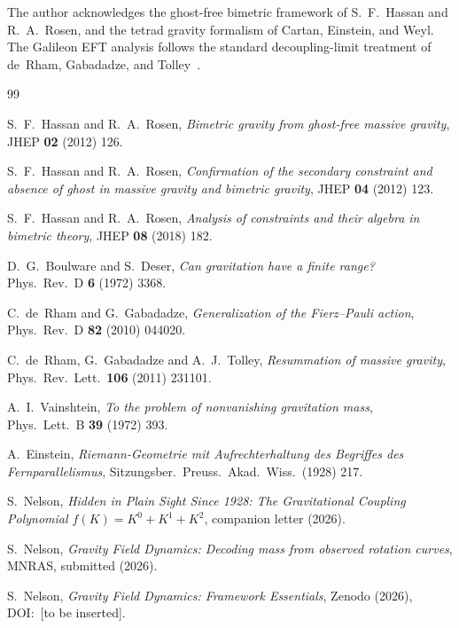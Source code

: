 \documentclass[a4paper,11pt]{article}
\begin{document}
\acknowledgments

The author acknowledges the ghost-free bimetric framework
of S.~F.~Hassan and R.~A.~Rosen, and the tetrad gravity
formalism of Cartan, Einstein, and Weyl. The Galileon
EFT analysis follows the standard decoupling-limit
treatment of de~Rham, Gabadadze, and
Tolley~\cite{deRham2010,deRham2011}.

\begin{thebibliography}{99}

S.~F.~Hassan and R.~A.~Rosen,
\emph{Bimetric gravity from ghost-free massive gravity},
JHEP \textbf{02} (2012) 126.

S.~F.~Hassan and R.~A.~Rosen,
\emph{Confirmation of the secondary constraint and absence
of ghost in massive gravity and bimetric gravity},
JHEP \textbf{04} (2012) 123.

S.~F.~Hassan and R.~A.~Rosen,
\emph{Analysis of constraints and their algebra in
bimetric theory},
JHEP \textbf{08} (2018) 182.

D.~G.~Boulware and S.~Deser,
\emph{Can gravitation have a finite range?}
Phys.\ Rev.\ D \textbf{6} (1972) 3368.

C.~de~Rham and G.~Gabadadze,
\emph{Generalization of the Fierz--Pauli action},
Phys.\ Rev.\ D \textbf{82} (2010) 044020.

C.~de~Rham, G.~Gabadadze and A.~J.~Tolley,
\emph{Resummation of massive gravity},
Phys.\ Rev.\ Lett.\ \textbf{106} (2011) 231101.

A.~I.~Vainshtein,
\emph{To the problem of nonvanishing gravitation mass},
Phys.\ Lett.\ B \textbf{39} (1972) 393.

A.~Einstein,
\emph{Riemann-Geometrie mit Aufrechterhaltung des Begriffes
des Fernparallelismus},
Sitzungsber.\ Preuss.\ Akad.\ Wiss.\ (1928) 217.

S.~Nelson,
\emph{Hidden in Plain Sight Since 1928: The Gravitational
Coupling Polynomial $f(K) = K^0 + K^1 + K^2$},
companion letter (2026).

S.~Nelson,
\emph{Gravity Field Dynamics: Decoding mass from observed
rotation curves},
MNRAS, submitted (2026).

S.~Nelson,
\emph{Gravity Field Dynamics: Framework Essentials},
Zenodo (2026), DOI:~[to be inserted].

\end{thebibliography}
\end{document}
